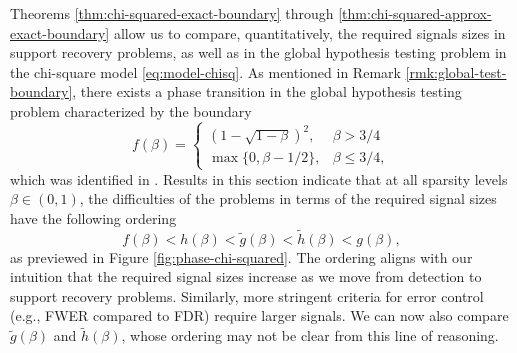 \begin{remark}
Theorems \ref{thm:chi-squared-exact-boundary} through \ref{thm:chi-squared-approx-exact-boundary} allow us to compare, quantitatively, the required signals sizes in support recovery problems, as well as in the global hypothesis testing problem in the chi-square model \eqref{eq:model-chisq}.
As mentioned in Remark \ref{rmk:global-test-boundary}, there exists a phase transition in the global hypothesis testing problem characterized by the boundary
\begin{equation} \label{eq:detection-boundary-chisquare}
    f(\beta) = 
    \begin{cases}
    \left(1-\sqrt{1-\beta}\right)^2, &\beta>3/4 \\
    \max\{0, \beta-1/2\}, &\beta\le3/4,
    \end{cases}
\end{equation}
which was identified in \citet{donoho2004higher}.
Results in this section indicate that at all sparsity levels $\beta\in(0,1)$, the difficulties of the problems in terms of the required signal sizes have the following ordering
$$
f(\beta) < h(\beta) < \widetilde{g}(\beta) < \widetilde{h}(\beta) < g(\beta),
$$
as previewed in Figure \ref{fig:phase-chi-squared}.
The ordering aligns with our intuition that the required signal sizes increase as we move from detection to support recovery problems.
Similarly, more stringent criteria for error control (e.g., FWER compared to FDR) require larger signals.
We can now also compare $\widetilde{g}(\beta)$ and $\widetilde{h}(\beta)$, whose ordering may not be clear from this line of reasoning.
\end{remark}